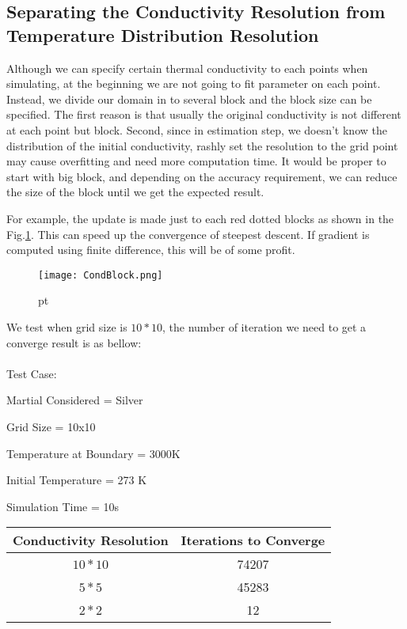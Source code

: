 \documentclass[10pt,a4paper]{report}
\begin{document}
\pagebreak

\subsection{Separating the Conductivity Resolution from Temperature Distribution Resolution}
Although we can specify certain thermal conductivity to each points when simulating, at the beginning we are not going to fit parameter on each point. Instead, we divide our domain in to several block and the block size can be specified. The first reason is that usually the original conductivity is not different at each point but block. Second, since in estimation step, we doesn't know the distribution of the initial conductivity, rashly set the resolution to the grid point may cause overfitting and need more computation time. It would be proper to start with big block, and depending on the accuracy requirement, we can reduce the size of the block until we get the expected result.

For example,  the update is made just to each red dotted blocks as shown in the Fig.\ref{fig:CondBlock}. This can speed up the convergence of steepest descent. If gradient is computed using finite difference, this will be of some profit.

\begin{figure}[h]
\begin{center}
\texttt{[image: CondBlock.png]} 
\caption{}  pt
\label{fig:CondBlock}
\end{center}
\end{figure}

We test when grid size is $10*10$, the number of iteration we need to get a converge result is as bellow:\\
\\
Test Case:

Martial Considered =  Silver

Grid Size = 10x10

Temperature at Boundary = 3000K

Initial Temperature = 273 K

Simulation Time = 10s\\
\begin{center}

\begin{tabular}{ |c|c| } 
 \hline
 Conductivity Resolution & Iterations to Converge \\ 
 \hline
 $10*10$ & 74207 \\ 
 \hline
 $5*5$   & 45283\\
 \hline
 $2*2$   & 12 \\ 
 \hline
\end{tabular}
\end{center}
\end{document}
